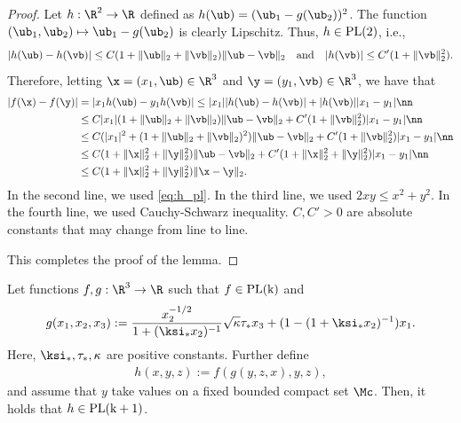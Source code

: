 \begin{proof}
Let $h:\R^2\rightarrow\R$ defined as $h(\ub)=(\ub_1-g(\ub_2))^2$. The function $(\ub_1,\ub_2)\mapsto\ub_1-g(\ub_2)$ is clearly Lipschitz. Thus, $h\in\rm{PL}(2)$, i.e., 
\begin{align}
|h(\ub)-h(\vb)| \leq C(1+\|\ub\|_2+\|\vb\|_2)\|\ub-\vb\|_2\quad\text{and}\quad |h(\vb)|\leq C'(1+\|\vb\|_2^2).\label{eq:h_pl}
\end{align} 
Therefore, letting $\x=(x_1,\ub)\in\R^3$ and $\y=(y_1,\vb)\in\R^3$, we have that 
\begin{align}
|f(\x)-f(\y)| &= |x_1h(\ub) - y_1h(\vb)| \leq |x_1||h(\ub)-h(\vb)| + |h(\vb)| |x_1-y_1|\nn\\
&\leq C|x_1|(1+\|\ub\|_2+\|\vb\|_2)\|\ub-\vb\|_2 + C'(1+\|\vb\|_2^2)|x_1-y_1| \nn\\
&\leq C(|x_1|^2+(1+\|\ub\|_2+\|\vb\|_2)^2)\|\ub-\vb\|_2 + C'(1+\|\vb\|_2^2)|x_1-y_1| \nn\\
&\leq C(1+\|\x\|_2^2+\|\y\|_2^2)\|\ub-\vb\|_2 + C'(1+\|\x\|_2^2+\|\y\|_2^2)|x_1-y_1| \nn\\
&\leq C(1+\|\x\|_2^2+\|\y\|_2^2)\|\x-\y\|_2.
\end{align}
In the second line, we used \eqref{eq:h_pl}. In the third line, we used $2xy\leq x^2+y^2$. In the fourth line, we used Cauchy-Schwarz inequality. $C,C'>0$ are absolute constants that may change from line to line.

This completes the proof of the lemma.
\end{proof}



\begin{lemma}\label{lem:hPL}
Let functions $f,g:\R^3\rightarrow\R$ such that $f\in\rm{PL}(k)$ and 
$$
g(x_1,x_2,x_3) := \frac{x_2^{-1/2}}{1+(\ksi_* x_2)^{-1}}\sqrt{\kappa}\tau_* x_3 + (1-(1+\ksi_*x_2)^{-1})x_1.
$$
Here, $\ksi_*,\tau_*,\kappa$ are positive constants. 
Further define 
\begin{align}
h(x,y,z) := f\left(g(y,z,x),y,z\right),
\end{align}
and assume that $y$ take values on a fixed bounded compact set $\Mc$.
Then, it holds that $h\in\rm{PL}(k+1)$.
\end{lemma}

